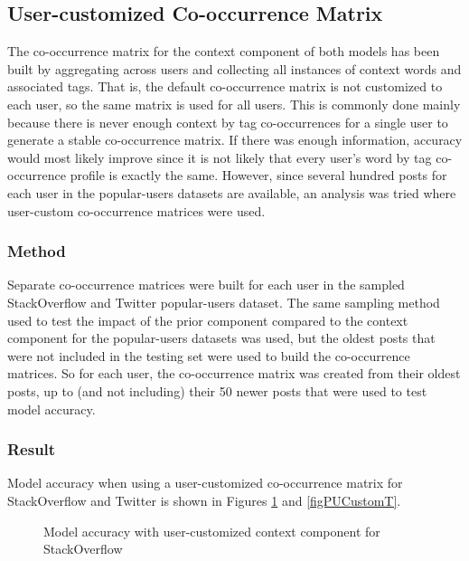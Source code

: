 \documentclass[man,floatsintext,donotrepeattitle]{apa6}
\begin{document}
\subsection{User-customized Co-occurrence Matrix}

The co-occurrence matrix for the context component of both models has been built by aggregating across users and collecting all instances of context words and associated tags.
That is, the default co-occurrence matrix is not customized to each user, so the same matrix is used for all users.
This is commonly done mainly because there is never enough context by tag co-occurrences for a single user to generate a stable co-occurrence matrix.
If there was enough information, accuracy would most likely improve since it is not likely that every user's word by tag co-occurrence profile is exactly the same.
However, since several hundred posts for each user in the popular-users datasets are available, an analysis was tried where user-custom co-occurrence matrices were used.

\subsubsection{Method}

Separate co-occurrence matrices were built for each user in the sampled StackOverflow and Twitter popular-users dataset.
The same sampling method used to test the impact of the prior component compared to the context component for the popular-users datasets was used,
but the oldest posts that were not included in the testing set were used to build the co-occurrence matrices.
So for each user, the co-occurrence matrix was created from their oldest posts, up to (and not including) their 50 newer posts that were used to test model accuracy. 

\subsubsection{Result}

Model accuracy when using a user-customized co-occurrence matrix for StackOverflow and Twitter is shown in Figures \ref{figPUCustomSO} and \ref{figPUCustomT}.

\begin{figure}[!htbp]
  \caption{Model accuracy with user-customized context component for StackOverflow}
  \label{figPUCustomSO}
\end{figure}
\end{document}
